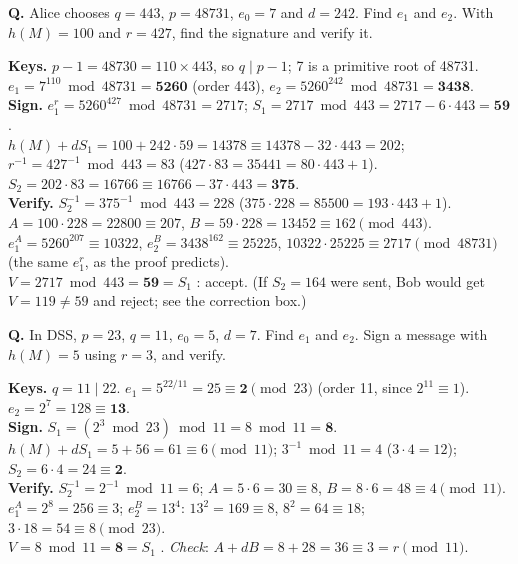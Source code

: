 \begin{worked}
\textbf{Q.} Alice chooses $q = 443$, $p = 48731$, $e_0 = 7$ and $d = 242$. Find $e_1$ and $e_2$. With $h(M) = 100$ and $r = 427$, find the signature and verify it.

\textbf{Keys.} $p - 1 = 48730 = 110 \times 443$, so $q \mid p - 1$; 7 is a primitive root of 48731. $e_1 = 7^{110} \bmod 48731 = \mathbf{5260}$ (order 443), \;$e_2 = 5260^{242} \bmod 48731 = \mathbf{3438}$.\\
\textbf{Sign.} $e_1^r = 5260^{427} \bmod 48731 = 2717$; \;$S_1 = 2717 \bmod 443 = 2717 - 6 \cdot 443 = \mathbf{59}$.\\
$h(M) + d S_1 = 100 + 242 \cdot 59 = 14378 \equiv 14378 - 32 \cdot 443 = 202$; \;$r^{-1} = 427^{-1} \bmod 443 = 83$ ($427 \cdot 83 = 35441 = 80 \cdot 443 + 1$).\\
$S_2 = 202 \cdot 83 = 16766 \equiv 16766 - 37 \cdot 443 = \mathbf{375}$.\\
\textbf{Verify.} $S_2^{-1} = 375^{-1} \bmod 443 = 228$ ($375 \cdot 228 = 85500 = 193 \cdot 443 + 1$).\\
$A = 100 \cdot 228 = 22800 \equiv 207$, \;$B = 59 \cdot 228 = 13452 \equiv 162 \pmod{443}$.\\
$e_1^A = 5260^{207} \equiv 10322$, \;$e_2^B = 3438^{162} \equiv 25225$, \;$10322 \cdot 25225 \equiv 2717 \pmod{48731}$ (the same $e_1^r$, as the proof predicts).\\
$V = 2717 \bmod 443 = \mathbf{59} = S_1$ \checkmark: accept. (If $S_2 = 164$ were sent, Bob would get $V = 119 \ne 59$ and reject; see the correction box.)
\end{worked}

\begin{worked}
\textbf{Q.} In DSS, $p = 23$, $q = 11$, $e_0 = 5$, $d = 7$. Find $e_1$ and $e_2$. Sign a message with $h(M) = 5$ using $r = 3$, and verify.

\textbf{Keys.} $q = 11 \mid 22$. $e_1 = 5^{22/11} = 25 \equiv \mathbf{2} \pmod{23}$ (order 11, since $2^{11} \equiv 1$). $e_2 = 2^7 = 128 \equiv \mathbf{13}$.\\
\textbf{Sign.} $S_1 = (2^3 \bmod 23) \bmod 11 = 8 \bmod 11 = \mathbf{8}$. \;$h(M) + dS_1 = 5 + 56 = 61 \equiv 6 \pmod{11}$; \;$3^{-1} \bmod 11 = 4$ ($3 \cdot 4 = 12$); \;$S_2 = 6 \cdot 4 = 24 \equiv \mathbf{2}$.\\
\textbf{Verify.} $S_2^{-1} = 2^{-1} \bmod 11 = 6$; \;$A = 5 \cdot 6 = 30 \equiv 8$, \;$B = 8 \cdot 6 = 48 \equiv 4 \pmod{11}$.\\
$e_1^A = 2^8 = 256 \equiv 3$; \;$e_2^B = 13^4$: $13^2 = 169 \equiv 8$, $8^2 = 64 \equiv 18$; \;$3 \cdot 18 = 54 \equiv 8 \pmod{23}$.\\
$V = 8 \bmod 11 = \mathbf{8} = S_1$ \checkmark. \emph{Check}: $A + dB = 8 + 28 = 36 \equiv 3 = r \pmod{11}$.
\end{worked}

